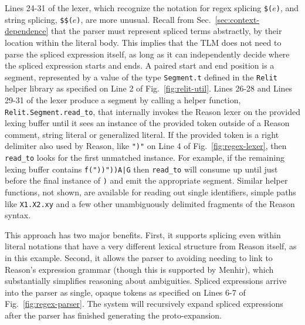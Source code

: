 \documentclass[acmsmall,screen]{acmart}
\newcommand{\li}[1]{\lstinline[basicstyle=\ttfamily\fontsize{9pt}{1em}\selectfont]{#1}}
\begin{document}
Lines 24-31 of the lexer, which recognize the notation for regex splicing \li{$(}$e$\li{)}, and string splicing, \li{$$(}$e$\li{)}, are more unusual. Recall from Sec.~\ref{sec:context-dependence} that the parser must represent spliced terms abstractly, by their location within the literal body. This implies that the TLM does not need to parse the spliced expression itself, as long as it can independently decide where the spliced expression starts and ends. A paired start and end position is a segment,  represented by a value of the type \li{Segment.t} defined in the \li{Relit} helper library as specified on Line 2 of Fig.~\ref{fig:relit-util}. Lines 26-28 and Lines 29-31 of the lexer produce a segment by calling a helper function, \li{Relit.Segment.read_to}, that internally invokes the Reason lexer on the provided lexing buffer until it sees an instance of the provided token outside of a Reason comment, string literal or generalized literal. If the provided token is a right delimiter also used by Reason, like \li{")"} on Line 4 of Fig.~\ref{fig:regex-lexer}, then \li{read_to} looks for the first unmatched instance. For example, if the remaining lexing buffer contains {\small \texttt{f("))"))A|G}} then \li{read_to} will consume up until just before the final instance of \li{)} and emit the appropriate segment. Similar helper functions, not shown, are available for reading out single identifiers, simple paths like \li{X1.X2.xy} and a few other unambiguously delimited fragments of the Reason syntax.

This approach has two major benefits. First, it supports splicing even within literal notations that have a very different lexical structure from Reason itself, as in this example. Second, it allows the parser to avoiding needing to link to Reason's expression grammar (though this is supported by Menhir), which substantially simplifies reasoning about ambiguities. Spliced expressions arrive into the parser as single, opaque tokens as specified on Lines 6-7 of Fig.~\ref{fig:regex-parser}. The system will recursively expand spliced expressions after the parser has finished generating the proto-expansion.


\end{document}
